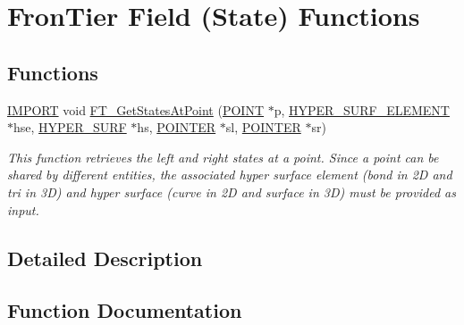 \hypertarget{group___f_i_e_l_d}{}\section{Fron\+Tier Field (State) Functions}
\label{group___f_i_e_l_d}
\subsection*{Functions}
\begin{DoxyCompactItemize}
\item 
\hyperlink{cdecs_8h_a773175d74e73776d69c3e538f17de1ee}{I\+M\+P\+O\+RT} void \hyperlink{group___f_i_e_l_d_ga01d421aa00940cf885ed1c7d0f4f5701}{F\+T\+\_\+\+Get\+States\+At\+Point} (\hyperlink{int_8h_a3a87c5c9d0146e30a4bf720f701e5a63}{P\+O\+I\+NT} $\ast$p, \hyperlink{int_8h_a17e21ae7174174d7a55516f8c9a8f12f}{H\+Y\+P\+E\+R\+\_\+\+S\+U\+R\+F\+\_\+\+E\+L\+E\+M\+E\+NT} $\ast$hse, \hyperlink{int_8h_acef50fa4757ce0d3f75c97fab5a175bc}{H\+Y\+P\+E\+R\+\_\+\+S\+U\+RF} $\ast$hs, \hyperlink{cdecs_8h_ae51a81000f343b8ec43bca1f6a723d7b}{P\+O\+I\+N\+T\+ER} $\ast$sl, \hyperlink{cdecs_8h_ae51a81000f343b8ec43bca1f6a723d7b}{P\+O\+I\+N\+T\+ER} $\ast$sr)
\begin{DoxyCompactList}\small\item\em This function retrieves the left and right states at a point. Since a point can be shared by different entities, the associated hyper surface element (bond in 2D and tri in 3D) and hyper surface (curve in 2D and surface in 3D) must be provided as input. \end{DoxyCompactList}\end{DoxyCompactItemize}


\subsection{Detailed Description}


\subsection{Function Documentation}
